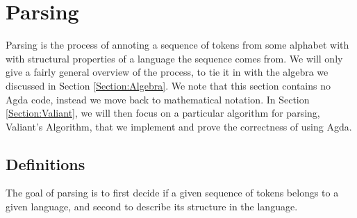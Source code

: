 \newcommand{\productions}{P}
\newcommand{\nonterminals}{N}
\newcommand{\terminals}{\Sigma}
\newcommand{\startsymbol}{S}
\newcommand{\grammar}{(\nonterminals, \terminals, \productions, \startsymbol)}
\section{Parsing}
Parsing is the process of annoting a sequence of tokens from some alphabet with with structural properties of a language the sequence comes from. We will only give a fairly general overview of the process, to tie it in with the algebra we discussed in Section \ref{Section:Algebra}. We note that this section contains no Agda code, instead we move back to mathematical notation. In Section \ref{Section:Valiant}, we will then focus on a particular algorithm for parsing, Valiant's Algorithm, that we implement and prove the correctness of using Agda.

\subsection{Definitions}
The goal of parsing is to first decide if a given sequence of tokens belongs to a given language, and second to describe its structure in the language.

